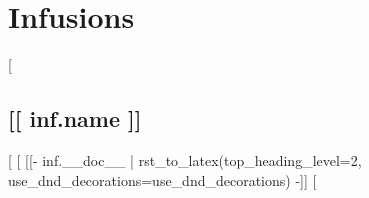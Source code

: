 \section*{Infusions}
[%
  \subsection*{[[ inf.name ]]}
  [%
  [%
  [[- inf.__doc__ | rst_to_latex(top_heading_level=2, use_dnd_decorations=use_dnd_decorations) -]]
[%
